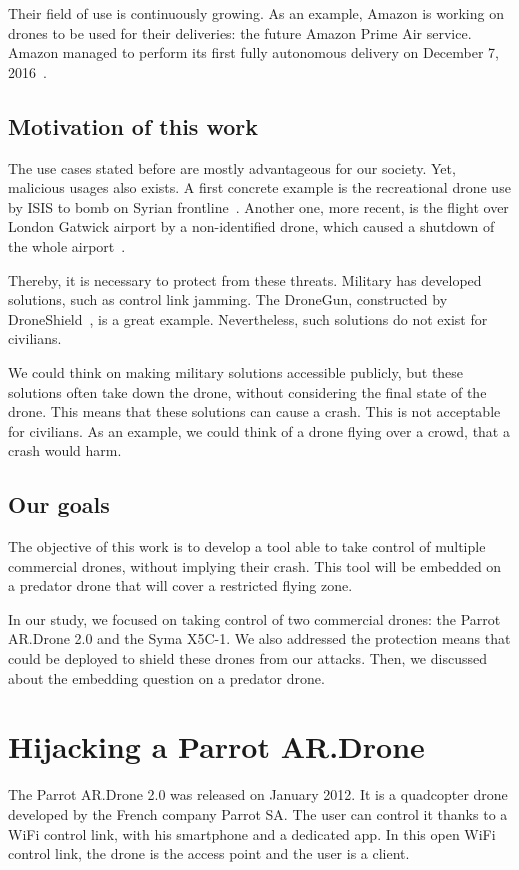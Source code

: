 \documentclass[conference,a4paper]{IEEEtran}
\begin{document}
Their field of use is continuously growing. As an example, Amazon is working on drones to
be used for their deliveries: the future Amazon Prime Air service. Amazon managed to
perform its first fully autonomous delivery on December 7, 2016~\cite{bib:amazon}.

\subsection{Motivation of this work}
The use cases stated before are mostly advantageous for our society. Yet, malicious usages
also exists. A first concrete example is the recreational drone use by ISIS to bomb on Syrian
frontline~\cite{bib:daesh}. Another one, more recent, is the flight over London Gatwick
airport by a non-identified drone, which caused a shutdown of the whole
airport~\cite{bib:gatwick}.

Thereby, it is necessary to protect from these threats. Military has developed solutions,
such as control link jamming. The DroneGun, constructed by
DroneShield~\cite{bib:droneshield}, is a great example. Nevertheless, such solutions
do not exist for civilians.

We could think on making military solutions accessible publicly, but these solutions often
take down the drone, without considering the final state of the drone. This means that
these solutions can cause a crash. This is not acceptable for civilians. As an example, we
could think of a drone flying over a crowd, that a crash would harm.

\subsection{Our goals}
The objective of this work is to develop a tool able to take control of multiple
commercial drones, without implying their crash. This tool will be embedded on a predator
drone that will cover a restricted flying zone.

In our study, we focused on taking control of two commercial drones: the Parrot AR.Drone
2.0 and the Syma X5C-1. We also addressed the protection means that could be deployed to
shield these drones from our attacks. Then, we discussed about the embedding question on a
predator drone.



\section{Hijacking a Parrot AR.Drone}
The Parrot AR.Drone 2.0 was released on January 2012. It is a quadcopter drone developed
by the French company Parrot SA\@. The user can control it thanks to a WiFi control link,
with his smartphone and a dedicated app. In this open WiFi control link, the drone is the
access point and the user is a client.
\end{document}
